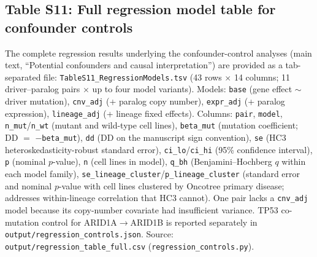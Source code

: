 \documentclass[11pt,a4paper]{article}
\begin{document}
\subsection{Table S11: Full regression model table for confounder controls}
The complete regression results underlying the confounder-control analyses (main text, ``Potential confounders and causal interpretation'') are provided as a tab-separated file: \texttt{TableS11\_RegressionModels.tsv} (43 rows $\times$ 14 columns; 11 driver--paralog pairs $\times$ up to four model variants). Models: \texttt{base} (gene effect $\sim$ driver mutation), \texttt{cnv\_adj} (+ paralog copy number), \texttt{expr\_adj} (+ paralog expression), \texttt{lineage\_adj} (+ lineage fixed effects). Columns: \texttt{pair}, \texttt{model}, \texttt{n\_mut}/\texttt{n\_wt} (mutant and wild-type cell lines), \texttt{beta\_mut} (mutation coefficient; DD $=$ $-$\texttt{beta\_mut}), \texttt{dd} (DD on the manuscript sign convention), \texttt{se} (HC3 heteroskedasticity-robust standard error), \texttt{ci\_lo}/\texttt{ci\_hi} (95\% confidence interval), \texttt{p} (nominal $p$-value), \texttt{n} (cell lines in model), \texttt{q\_bh} (Benjamini--Hochberg $q$ within each model family), \texttt{se\_lineage\_cluster}/\texttt{p\_lineage\_cluster} (standard error and nominal $p$-value with cell lines clustered by Oncotree primary disease; addresses within-lineage correlation that HC3 cannot). One pair lacks a \texttt{cnv\_adj} model because its copy-number covariate had insufficient variance. TP53 co-mutation control for ARID1A$\rightarrow$ARID1B is reported separately in \texttt{output/regression\_controls.json}. Source: \texttt{output/regression\_table\_full.csv} (\texttt{regression\_controls.py}).
\end{document}
